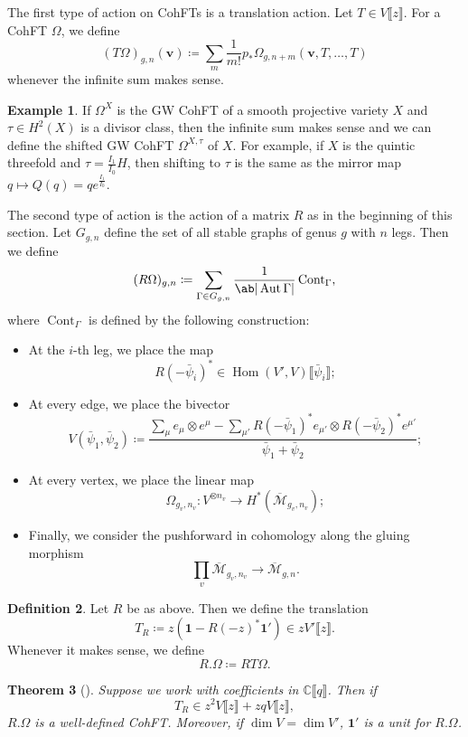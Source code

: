 \documentclass[10pt,oldfontcommands,oneside]{memoir}
\newtheorem{thm}{Theorem}[section]
\theoremstyle{definition}
\newtheorem{defn}[thm]{Definition}
\newtheorem{exm}[thm]{Example}
\theoremstyle{remark}
\theoremstyle{plain}
\theoremstyle{definition}
\theoremstyle{remark}
\newcommand{\C}{\mathbb{C}}
\newcommand{\Mbar}{\overline{\mathcal{M}}}
\newcommand{\mbf}[1]{\mathbf{#1}}
\newcommand{\bv}{\mbf{v}}
\newcommand{\on}[1]{\operatorname{#1}}
\newcommand{\1}{\mathbf{1}}
\newcommand{\2}{\mathbf{2}}
\newcommand{\3}{\mathbf{3}}
\newcommand{\ps}[1]{\llbracket #1 \rrbracket}
\DeclareMathOperator{\Hom}{Hom}
\DeclareMathOperator{\Aut}{Aut}
\begin{document}
The first type of action on CohFTs is a translation action. Let $T \in V\ps{z}$. For a CohFT $\Omega$, we define
\[ (T\Omega)_{g,n}(\bv) \coloneqq \sum_m \frac{1}{m!} p_* \Omega_{g,n+m}(\bv, T,\ldots,T) \]
whenever the infinite sum makes sense.

\begin{exm}
    If $\Omega^X$ is the GW CohFT of a smooth projective variety $X$ and $\tau \in H^2(X)$ is a divisor class, then the infinite sum makes sense and we can define the shifted GW CohFT $\Omega^{X,\tau}$ of $X$. For example, if $X$ is the quintic threefold and $\tau = \frac{I_1}{I_0} H$, then shifting to $\tau$ is the same as the mirror map $q \mapsto Q(q) = q e^{\frac{I_1}{I_0}}$.
\end{exm}

The second type of action is the action of a matrix $R$ as in the beginning of this section. Let $G_{g,n}$ define the set of all stable graphs of genus $g$ with $n$ legs. Then we define
\[ (R\Omega)_{g,n} \coloneqq \sum_{\Gamma \in G_{g,n}} \frac{1}{\ab|\Aut \Gamma|} \on{Cont}_{\Gamma}, \]
where $\on{Cont}_{\Gamma}$ is defined by the following construction:
\begin{itemize}
    \item At the $i$-th leg, we place the map 
        \[ R(-\bar{\psi}_i)^* \in \Hom(V',V) \ps{\bar{\psi}_i}; \]
    \item At every edge, we place the bivector
        \[ V(\bar{\psi}_1, \bar{\psi}_2) \coloneqq  \frac{\sum_{\mu}e_{\mu} \otimes e^{\mu} - \sum_{\mu'} R(-\bar{\psi}_1)^* e_{\mu'} \otimes R(-\bar{\psi}_2)^* e^{\mu'}}{\bar{\psi}_1 + \bar{\psi}_2}; \]
    \item At every vertex, we place the linear map
        \[ \Omega_{g_v, n_v} \colon V^{\otimes n_v} \to H^*(\Mbar_{g_v, n_v}); \]
    \item Finally, we consider the pushforward in cohomology along the gluing morphism \[ \prod_v \Mbar_{g_v, n_v} \to \Mbar_{g,n}. \]
\end{itemize}

\begin{defn}
    Let $R$ be as above. Then we define the translation
    \[ T_R \coloneqq z (\1 - R(-z)^* \1') \in z V'\ps{z}. \]
    Whenever it makes sense, we define
    \[ R.\Omega \coloneqq RT\Omega. \]
\end{defn}

\begin{thm}[{\cite{nmsp3}}]
    Suppose we work with coefficients in $\C\ps{q}$. Then if
    \[ T_R \in z^2 V \ps{z} + zq V \ps{z}, \]
    $R.\Omega$ is a well-defined CohFT. Moreover, if $\dim V = \dim V'$, $\1'$ is a unit for $R.\Omega$.
\end{thm}
\end{document}
